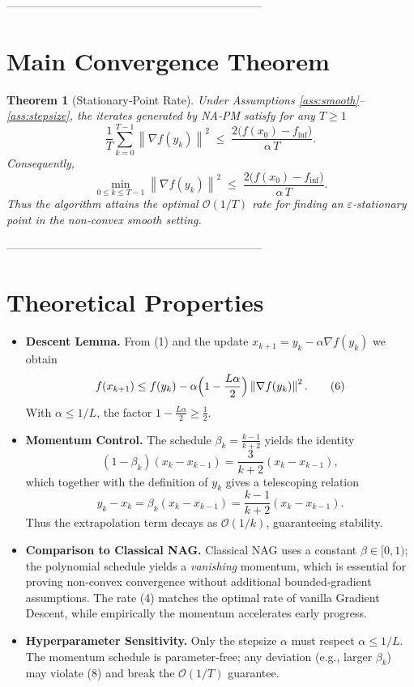 \documentclass{article}
\newtheorem{theorem}{Theorem}
\newcommand{\norm}[1]{\left\lVert#1\right\rVert}
\begin{document}
--------------------------------------------------------------------

\section*{Main Convergence Theorem}
\begin{theorem}[Stationary‑Point Rate]\label{thm:main}
Under Assumptions \ref{ass:smooth}–\ref{ass:stepsize}, the iterates generated by NA‑PM satisfy for any $T\ge 1$
\[
\frac{1}{T}\sum_{k=0}^{T-1}\norm{\nabla f(y_k)}^2
\;\le\;
\frac{2\bigl(f(x_0)-f_{\inf}\bigr)}{\alpha\,T}.
\tag{4}
\]
Consequently,
\[
\min_{0\le k\le T-1}\norm{\nabla f(y_k)}^2
\;\le\;
\frac{2\bigl(f(x_0)-f_{\inf}\bigr)}{\alpha\,T}.
\tag{5}
\]
Thus the algorithm attains the optimal $\mathcal O(1/T)$ rate for finding an $\varepsilon$‑stationary point in the non‑convex smooth setting.
\end{theorem}

--------------------------------------------------------------------

\section*{Theoretical Properties}
\begin{itemize}[leftmargin=*]
\item \textbf{Descent Lemma.} From (1) and the update $x_{k+1}=y_k-\alpha\nabla f(y_k)$ we obtain
\[
f(x_{k+1})\le f(y_k)-\alpha\Bigl(1-\frac{L\alpha}{2}\Bigr)\norm{\nabla f(y_k)}^2 .
\tag{6}
\]
With $\alpha\le 1/L$, the factor $1-\frac{L\alpha}{2}\ge \tfrac12$.

\item \textbf{Momentum Control.} The schedule $\beta_k=\frac{k-1}{k+2}$ yields the identity
\[
(1-\beta_k)(x_k-x_{k-1}) = \frac{3}{k+2}(x_k-x_{k-1}),
\tag{7}
\]
which together with the definition of $y_k$ gives a telescoping relation
\[
y_k - x_k = \beta_k (x_k-x_{k-1}) = \frac{k-1}{k+2}(x_k-x_{k-1}).
\tag{8}
\]
Thus the extrapolation term decays as $\mathcal O(1/k)$, guaranteeing stability.

\item \textbf{Comparison to Classical NAG.}
Classical NAG uses a constant $\beta\in[0,1)$; the polynomial schedule yields a \emph{vanishing} momentum, which is essential for proving non‑convex convergence without additional bounded‑gradient assumptions. The rate (4) matches the optimal rate of vanilla Gradient Descent, while empirically the momentum accelerates early progress.

\item \textbf{Hyperparameter Sensitivity.}
Only the stepsize $\alpha$ must respect $\alpha\le 1/L$. The momentum schedule is parameter‑free; any deviation (e.g., larger $\beta_k$) may violate (8) and break the $\mathcal O(1/T)$ guarantee.

\end{itemize}
\end{document}
